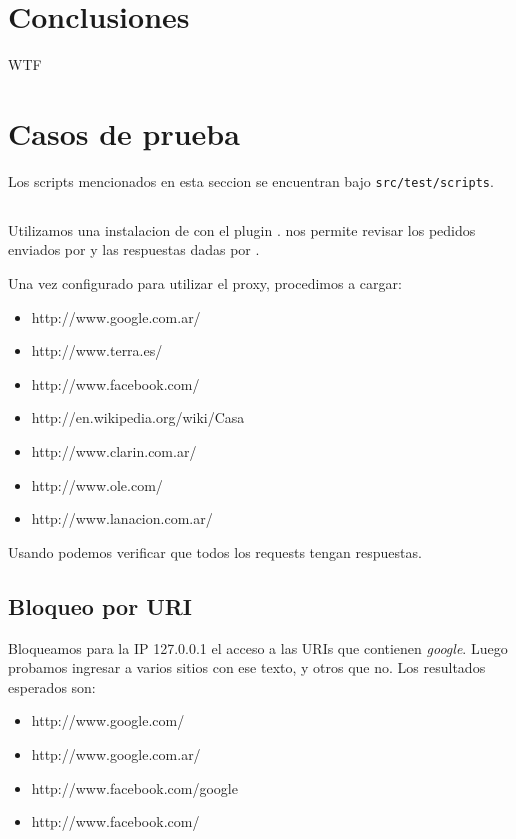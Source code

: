 \documentclass[11pt,a4paper,titlepage]{article}
\begin{document}

\section{Conclusiones}
    WTF

\section{Casos de prueba}

    Los scripts mencionados en esta seccion se encuentran bajo \texttt{src/test/scripts}.

    \subsection{}
    Utilizamos una instalacion de  con el plugin .
     nos permite revisar los pedidos enviados por  y las respuestas dadas por \duta.

    Una vez configurado  para utilizar el proxy, procedimos a cargar:
    \begin{itemize}
        \item http://www.google.com.ar/
        \item http://www.terra.es/
        \item http://www.facebook.com/
        \item http://en.wikipedia.org/wiki/Casa
        \item http://www.clarin.com.ar/
        \item http://www.ole.com/
        \item http://www.lanacion.com.ar/
    \end{itemize}

    Usando  podemos verificar que todos los requests tengan respuestas.

    \subsection{Bloqueo por URI}
    Bloqueamos para la IP 127.0.0.1 el acceso a las URIs que contienen \textit{google}.
    Luego probamos ingresar a varios sitios con ese texto, y otros que no.
    Los resultados esperados son:

    \begin{itemize}
        \item http://www.google.com/
        \item http://www.google.com.ar/
        \item http://www.facebook.com/google
        \item http://www.facebook.com/
    \end{itemize}
\end{document}
